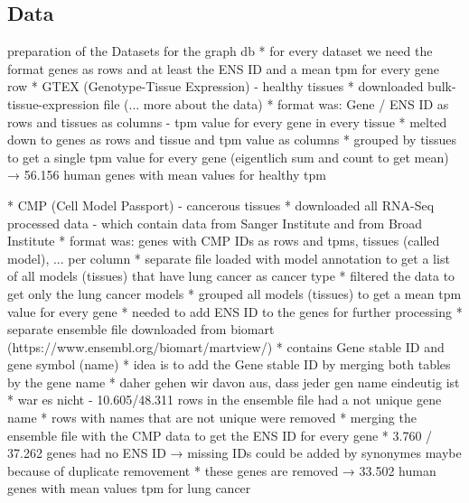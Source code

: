 \subsection{Data} \label{subsec:data}



{\color{lightgray}

preparation of the Datasets for the graph db
* for every dataset we need the format genes as rows and at least the ENS ID and a mean tpm for every gene row
    * GTEX (Genotype-Tissue Expression) - healthy tissues
        * downloaded bulk-tissue-expression file (... more about the data)
        * format was: Gene / ENS ID as rows and tissues as columns - tpm value for every gene in every tissue
        * melted down to genes as rows and tissue and tpm value as columns
        * grouped by tissues to get a single tpm value for every gene (eigentlich sum and count to get mean)
    → 56.156 human genes with mean values for healthy tpm

    * CMP (Cell Model Passport) - cancerous tissues
        * downloaded all RNA-Seq processed data - which contain data from Sanger Institute and from Broad Institute
        * format was: genes with CMP IDs as rows and tpms, tissues (called model), ... per column
        * separate file loaded with model annotation to get a list of all models (tissues) that have lung cancer as cancer type
        * filtered the data to get only the lung cancer models
        * grouped all models (tissues) to get a mean tpm value for every gene
        * needed to add ENS ID to the genes for further processing
        * separate ensemble file downloaded from biomart (https://www.ensembl.org/biomart/martview/)
        * contains Gene stable ID and gene symbol (name)
        * idea is to add the Gene stable ID by merging both tables by the gene name
        * daher gehen wir davon aus, dass jeder gen name eindeutig ist
        * war es nicht - 10.605/48.311 rows in the ensemble file had a not unique gene name
        * rows with names that are not unique were removed
        * merging the ensemble file with the CMP data to get the ENS ID for every gene
        * 3.760 / 37.262 genes had no ENS ID → missing IDs could be added by synonymes maybe because of duplicate removement
        * these genes are removed
    → 33.502 human genes with mean values tpm for lung cancer
}
